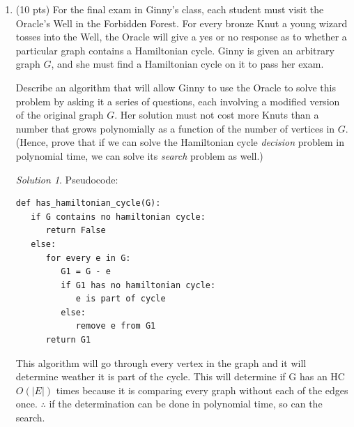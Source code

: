 \documentclass[12pt]{article}
\theoremstyle{remark}
\newtheorem*{solution}{Solution}
\begin{document}
\begin{enumerate}
\begin{enumerate}
	
	
	\item (10 pts) For the final exam in Ginny's class, each student must visit the Oracle's Well in the Forbidden Forest. For every bronze Knut a young wizard tosses into the Well, the Oracle will give a yes or no response as to whether a particular graph contains a Hamiltonian cycle. Ginny is given an arbitrary graph $G$, and she must find a Hamiltonian cycle on it to pass her exam.
	
	Describe an algorithm that will allow Ginny to use the Oracle to solve this problem by asking it a series of questions, each involving a modified version of the original graph $G$. Her solution must not cost more Knuts than a number that grows polynomially as a function of the number of vertices in $G$. (Hence, prove that if we can solve the Hamiltonian cycle \textit{decision} problem in polynomial time, we can solve its \textit{search} problem as well.)\\
		\begin{solution}
    Pseudocode:
\begin{verbatim}
def has_hamiltonian_cycle(G):
   if G contains no hamiltonian cycle:
      return False
   else:
      for every e in G:
         G1 = G - e
         if G1 has no hamiltonian cycle:
            e is part of cycle
         else:
            remove e from G1
      return G1
\end{verbatim}
This algorithm will go through every vertex in the graph and it will determine weather it is part of the cycle. This will determine if G has an HC $O(|E|)$ times because it is comparing every graph without each of the edges once.  $\therefore$ if the determination can be done in polynomial time, so can the search.
    \end{solution}
	
	\end{enumerate}
    
\end{enumerate}
\end{document}
